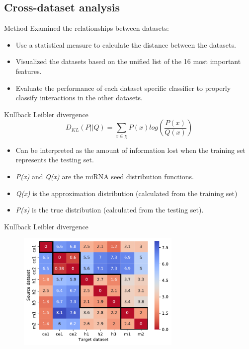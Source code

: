 \documentclass{beamer}
\begin{document}
\subsection{Cross-dataset analysis}
\begin{frame}{Method}
Examined the relationships between datasets:
\begin{itemize}
\item Use a statistical measure to calculate the distance between the datasets. 
\item Visualized the datasets based on the unified list of the 16 most important features.
\item Evaluate the performance of each dataset specific classifier to properly classify interactions in the other datasets.
\end{itemize}
\end{frame}

\begin{frame}{Kullback Leibler divergence}
\begin{equation}
 D_{KL} \left (P ||Q \right ) = \sum_{x\in \chi }{P\left ( x \right )log\left ( \frac{P\left ( x \right )}{Q\left ( x \right )} \right )}\label{eq:1}
\end{equation}
\begin{itemize}
\item Can be interpreted as the amount of information lost when the training set represents the testing set.
\item  \textit{P(x)} and \textit{Q(x)} are the miRNA seed distribution functions. 
\item \textit{Q(x)} is the approximation distribution (calculated from the training set) 
\item \textit{P(x)} is the true distribution (calculated from the testing set). 
\end{itemize}

\end{frame}

\begin{frame}{Kullback Leibler divergence}

\begin{figure}[h!]
      \includegraphics[width = 0.7\textwidth]{images/4_divergence_reverse.pdf}
      \label{fig:divergence}
      
      \end{figure}
\end{frame}
\end{document}
